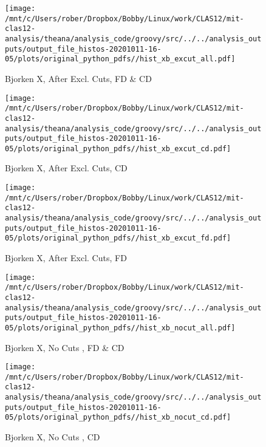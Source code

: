 \documentclass{article}
\begin{document}
\begin{landscape}
    \begin{figure}[h]
        \centering

        \texttt{[image: /mnt/c/Users/rober/Dropbox/Bobby/Linux/work/CLAS12/mit-clas12-analysis/theana/analysis\_code/groovy/src/../../analysis\_outputs/output\_file\_histos-20201011-16-05/plots/original\_python\_pdfs//hist\_xb\_excut\_all.pdf]}
        \captionsetup{textformat=empty,labelformat=blank}
        \caption{Bjorken X, After Excl. Cuts, FD \& CD}
    \end{figure}
    \clearpage
    
    \begin{figure}[h]
        \centering

        \texttt{[image: /mnt/c/Users/rober/Dropbox/Bobby/Linux/work/CLAS12/mit-clas12-analysis/theana/analysis\_code/groovy/src/../../analysis\_outputs/output\_file\_histos-20201011-16-05/plots/original\_python\_pdfs//hist\_xb\_excut\_cd.pdf]}
        \captionsetup{textformat=empty,labelformat=blank}
        \caption{Bjorken X, After Excl. Cuts, CD}
    \end{figure}
    \clearpage
    
    \begin{figure}[h]
        \centering

        \texttt{[image: /mnt/c/Users/rober/Dropbox/Bobby/Linux/work/CLAS12/mit-clas12-analysis/theana/analysis\_code/groovy/src/../../analysis\_outputs/output\_file\_histos-20201011-16-05/plots/original\_python\_pdfs//hist\_xb\_excut\_fd.pdf]}
        \captionsetup{textformat=empty,labelformat=blank}
        \caption{Bjorken X, After Excl. Cuts, FD}
    \end{figure}
    \clearpage
    
    \begin{figure}[h]
        \centering

        \texttt{[image: /mnt/c/Users/rober/Dropbox/Bobby/Linux/work/CLAS12/mit-clas12-analysis/theana/analysis\_code/groovy/src/../../analysis\_outputs/output\_file\_histos-20201011-16-05/plots/original\_python\_pdfs//hist\_xb\_nocut\_all.pdf]}
        \captionsetup{textformat=empty,labelformat=blank}
        \caption{Bjorken X, No Cuts , FD \& CD}
    \end{figure}
    \clearpage
    
    \begin{figure}[h]
        \centering

        \texttt{[image: /mnt/c/Users/rober/Dropbox/Bobby/Linux/work/CLAS12/mit-clas12-analysis/theana/analysis\_code/groovy/src/../../analysis\_outputs/output\_file\_histos-20201011-16-05/plots/original\_python\_pdfs//hist\_xb\_nocut\_cd.pdf]}
        \captionsetup{textformat=empty,labelformat=blank}
        \caption{Bjorken X, No Cuts , CD}
    \end{figure}
    \clearpage
    

\end{landscape}
\end{document}
